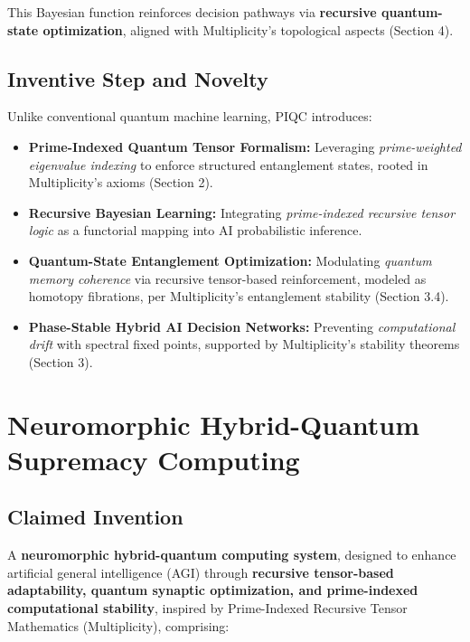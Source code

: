 \documentclass[12pt]{article}
\begin{document}
This Bayesian function reinforces decision pathways via \textbf{recursive quantum-state optimization}, aligned with Multiplicity’s topological aspects (Section 4).

\subsection{Inventive Step and Novelty}

Unlike conventional quantum machine learning, PIQC introduces:
\begin{itemize}
    \item \textbf{Prime-Indexed Quantum Tensor Formalism:} Leveraging \textit{prime-weighted eigenvalue indexing} to enforce structured entanglement states, rooted in Multiplicity’s axioms (Section 2).
    \item \textbf{Recursive Bayesian Learning:} Integrating \textit{prime-indexed recursive tensor logic} as a functorial mapping into AI probabilistic inference.
    \item \textbf{Quantum-State Entanglement Optimization:} Modulating \textit{quantum memory coherence} via recursive tensor-based reinforcement, modeled as homotopy fibrations, per Multiplicity’s entanglement stability (Section 3.4).
    \item \textbf{Phase-Stable Hybrid AI Decision Networks:} Preventing \textit{computational drift} with spectral fixed points, supported by Multiplicity’s stability theorems (Section 3).
\end{itemize}

\section{Neuromorphic Hybrid-Quantum Supremacy Computing}

\subsection{Claimed Invention}

A \textbf{neuromorphic hybrid-quantum computing system}, designed to enhance artificial general intelligence (AGI) through \textbf{recursive tensor-based adaptability, quantum synaptic optimization, and prime-indexed computational stability}, inspired by Prime-Indexed Recursive Tensor Mathematics (Multiplicity), comprising:
\end{document}
